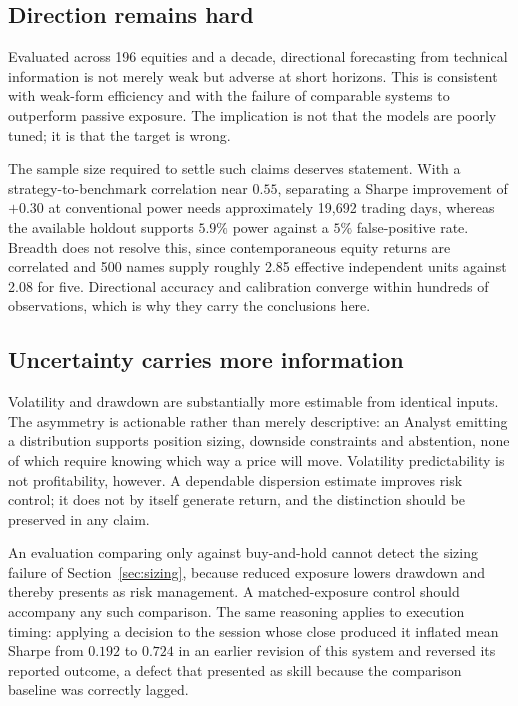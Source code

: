 \documentclass[conference]{IEEEtran}
\begin{document}
\subsection{Direction remains hard}
Evaluated across 196 equities and a decade, directional forecasting from
technical information is not merely weak but adverse at short horizons. This
is consistent with weak-form efficiency and with the failure of comparable
systems to outperform passive exposure. The implication is not that the
models are poorly tuned; it is that the target is wrong.

The sample size required to settle such claims deserves statement. With a
strategy-to-benchmark correlation near $0.55$, separating a Sharpe
improvement of $+0.30$ at conventional power needs approximately 19{,}692
trading days, whereas the available holdout supports $5.9\%$ power against a
$5\%$ false-positive rate. Breadth does not resolve this, since
contemporaneous equity returns are correlated and 500 names supply roughly
2.85 effective independent units against 2.08 for five. Directional accuracy
and calibration converge within hundreds of observations, which is why they
carry the conclusions here.

\subsection{Uncertainty carries more information}
Volatility and drawdown are substantially more estimable from identical
inputs. The asymmetry is actionable rather than merely descriptive: an
Analyst emitting a distribution supports position sizing, downside
constraints and abstention, none of which require knowing which way a price
will move. Volatility predictability is not profitability, however. A
dependable dispersion estimate improves risk control; it does not by itself
generate return, and the distinction should be preserved in any claim.

An evaluation comparing only against buy-and-hold cannot detect the sizing
failure of Section~\ref{sec:sizing}, because reduced exposure lowers drawdown
and thereby presents as risk management. A matched-exposure control should
accompany any such comparison. The same reasoning applies to execution
timing: applying a decision to the session whose close produced it inflated
mean Sharpe from $0.192$ to $0.724$ in an earlier revision of this system and
reversed its reported outcome, a defect that presented as skill because the
comparison baseline was correctly lagged.
\end{document}
